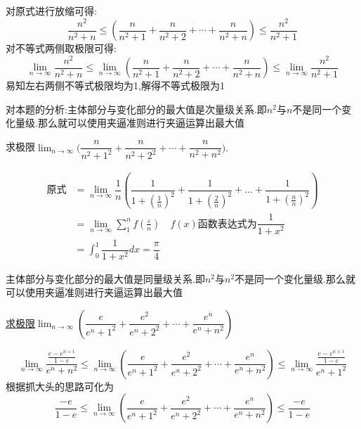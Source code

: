 \documentclass[8pt a4paper, oneside, UTF8]{ctexbook}
\begin{document}
\begin{sloppypar}
\begin{solution}
        对原式进行放缩可得:
        $$
            \dfrac{n^2}{n^2+n} \leqslant \left(\dfrac n{n^2+1}+\dfrac n{n^2+2}+\cdots+\dfrac n{n^2+n}\right) \leqslant \dfrac{n^2}{n^2+1}
        $$
        对不等式两侧取极限可得:
        $$
            \lim_{n \to \infty} \dfrac{n^2}{n^2+n} \leqslant \lim_{n \to \infty} \left(\dfrac n{n^2+1}+\dfrac n{n^2+2}+\cdots+\dfrac n{n^2+n}\right) \leqslant \lim_{n \to \infty} \dfrac{n^2}{n^2+1}
        $$
        易知左右两侧不等式极限均为1,解得不等式极限为1
    \end{solution}
    \begin{note}
        对本题的分析:主体部分与变化部分的最大值是次量级关系.即$n^2$与$n$不是同一个变化量级.那么就可以使用夹逼准则进行夹逼运算出最大值
    \end{note}
    \begin{problem}
        求极限$\lim_{n\to\infty}\Big(\dfrac n{n^2+1^2}+\dfrac n{n^2+2^2}+\cdots+\dfrac n{n^2+n^2}\Big).$    
    \end{problem}
    \begin{solution}
        \begin{align*}
          \text{原式} & = \lim_{n \to \infty}\dfrac{1}{n}(\dfrac{1}{1+(\frac{1}{n})^2}+\dfrac{1}{1+(\frac{2}{n})^2}+...+\dfrac{1}{1+(\frac{n}{n})^2})\\
          & = \lim_{n \to \infty} \sum_{1}^{n}f(\frac{\varepsilon}{n}) \quad f(x)\text{函数表达式为}\dfrac{1}{1+x^2}\\
          & = \int_0 ^1 \dfrac{1}{1+x^2} dx =\dfrac{\pi}{4}
        \end{align*}
    \end{solution}
    \begin{note}
        主体部分与变化部分的最大值是同量级关系.即$n^2$与$n^2$不是同一个变化量级.那么就可以使用夹逼准则进行夹逼运算出最大值
    \end{note}
    \begin{problem}
        \uline{求极限}$\lim_{n\to\infty}\left(\dfrac{e}{e^{n}+1^{2}}+\dfrac{e^{2}}{e^{n}+2^{2}}+\cdots+\dfrac{e^{n}}{e^{n}+n^{2}}\right)$
    \end{problem}
    \begin{solution}
        $$\lim_{n \to \infty} \dfrac{\frac{e-e^{n+1}}{1-e}}{e^n+n^2} \leqslant \lim_{n\to\infty}\left(\dfrac{e}{e^{n}+1^{2}}+\dfrac{e^{2}}{e^{n}+2^{2}}+\cdots+\dfrac{e^{n}}{e^{n}+n^{2}}\right) \leqslant \lim_{n \to \infty} \dfrac{\frac{e-e^{n+1}}{1-e}}{e^n+1^2}$$
        根据抓大头的思路可化为
        $$
        \dfrac{-e}{1-e} \leqslant \lim_{n\to\infty}\left(\dfrac{e}{e^{n}+1^{2}}+\dfrac{e^{2}}{e^{n}+2^{2}}+\cdots+\dfrac{e^{n}}{e^{n}+n^{2}}\right) \leqslant \dfrac{-e}{1-e}
$$
\end{solution}
\end{sloppypar}
\end{document}
